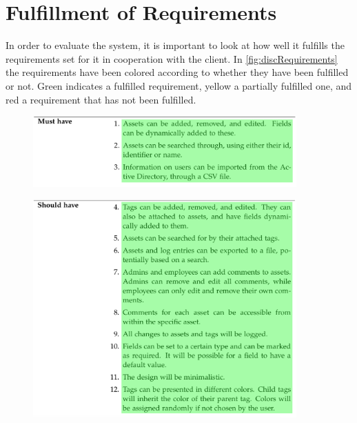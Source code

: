 \section{Fulfillment of Requirements}\label{sc:discRequirement}
In order to evaluate the system, it is important to look at how well it fulfills the requirements set for it in cooperation with the client. In \autoref{fig:discRequirements} the requirements have been colored according to whether they have been fulfilled or not. Green indicates a fulfilled requirement, yellow a partially fulfilled one, and red a requirement that has not been fulfilled.  




\begin{figure}[H]
    \centering
    \includegraphics[width=0.9\textwidth]{figures/Requirements/MustHave.png}
\end{figure}
\vspace{-10mm}
\begin{figure}[H]
    \centering
    \includegraphics[width=0.9\textwidth]{figures/Requirements/ShouldHave.png}
\end{figure}
\vspace{-10mm}
